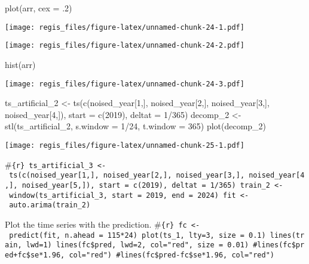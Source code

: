 \documentclass[
]{article}
\newenvironment{Shaded}{\begin{snugshade}}{\end{snugshade}}
\newcommand{\AttributeTok}[1]{\textcolor[rgb]{0.77,0.63,0.00}{#1}}
\newcommand{\DecValTok}[1]{\textcolor[rgb]{0.00,0.00,0.81}{#1}}
\newcommand{\FunctionTok}[1]{\textcolor[rgb]{0.00,0.00,0.00}{#1}}
\newcommand{\NormalTok}[1]{#1}
\newcommand{\OtherTok}[1]{\textcolor[rgb]{0.56,0.35,0.01}{#1}}
\newcommand{\SpecialCharTok}[1]{\textcolor[rgb]{0.00,0.00,0.00}{#1}}
\begin{document}
\begin{Shaded}
\begin{Highlighting}[]
\FunctionTok{plot}\NormalTok{(arr, }\AttributeTok{cex =}\NormalTok{ .}\DecValTok{2}\NormalTok{)}
\end{Highlighting}
\end{Shaded}

\texttt{[image: regis\_files/figure-latex/unnamed-chunk-24-1.pdf]}

\begin{Shaded}
\end{Shaded}

\texttt{[image: regis\_files/figure-latex/unnamed-chunk-24-2.pdf]}

\begin{Shaded}
\begin{Highlighting}[]
\FunctionTok{hist}\NormalTok{(arr)}
\end{Highlighting}
\end{Shaded}

\texttt{[image: regis\_files/figure-latex/unnamed-chunk-24-3.pdf]}

\begin{Shaded}
\begin{Highlighting}[]
\NormalTok{ts\_artificial\_2 }\OtherTok{\textless{}{-}} \FunctionTok{ts}\NormalTok{(}\FunctionTok{c}\NormalTok{(noised\_year[}\DecValTok{1}\NormalTok{,], noised\_year[}\DecValTok{2}\NormalTok{,], noised\_year[}\DecValTok{3}\NormalTok{,], noised\_year[}\DecValTok{4}\NormalTok{,]), }\AttributeTok{start =} \FunctionTok{c}\NormalTok{(}\DecValTok{2019}\NormalTok{), }\AttributeTok{deltat =} \DecValTok{1}\SpecialCharTok{/}\DecValTok{365}\NormalTok{)}
\NormalTok{decomp\_2 }\OtherTok{\textless{}{-}} \FunctionTok{stl}\NormalTok{(ts\_artificial\_2, }\AttributeTok{s.window =} \DecValTok{1}\SpecialCharTok{/}\DecValTok{24}\NormalTok{, }\AttributeTok{t.window =} \DecValTok{365}\NormalTok{)}
\FunctionTok{plot}\NormalTok{(decomp\_2)}
\end{Highlighting}
\end{Shaded}

\texttt{[image: regis\_files/figure-latex/unnamed-chunk-25-1.pdf]}

\#\texttt{\{r\}\ ts\_artificial\_3\ \textless{}-\ ts(c(noised\_year{[}1,{]},\ noised\_year{[}2,{]},\ noised\_year{[}3,{]},\ noised\_year{[}4,{]},\ noised\_year{[}5,{]}),\ start\ =\ c(2019),\ deltat\ =\ 1/365)\ train\_2\ \textless{}-\ window(ts\_artificial\_3,\ start\ =\ 2019,\ end\ =\ 2024)\ fit\ \textless{}-\ auto.arima(train\_2)}

Plot the time series with the prediction.
\#\texttt{\{r\}\ fc\ \textless{}-\ predict(fit,\ n.ahead\ =\ 115*24)\ plot(ts\_1,\ lty=3,\ size\ =\ 0.1)\ lines(train,\ lwd=1)\ lines(fc\$pred,\ lwd=2,\ col="red",\ size\ =\ 0.01)\ \#lines(fc\$pred+fc\$se*1.96,\ col="red")\ \#lines(fc\$pred-fc\$se*1.96,\ col="red")}
\end{document}
